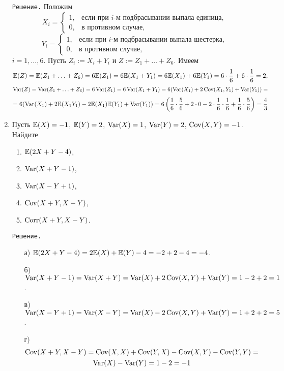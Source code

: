 \begin{enumerate}
\verb"Решение." Положим
\[
X_i =
            \begin{cases}
                            1,     &   \text{если при $i$-м подбрасывании выпала единица,} \\
                            0,     &   \text{в противном случае,}
            \end{cases}
\]
\[
Y_i =
            \begin{cases}
                            1,     &   \text{если при $i$-м подбрасывании выпала шестерка,} \\
                            0,     &   \text{в противном случае,}
            \end{cases}
\]
$i=1, \ldots, 6$. Пусть $Z_i := X_i + Y_i$ и $Z := Z_1 + \ldots + Z_6$. Имеем
\[
\mathbb{E}(Z) = \mathbb{E}(Z_1 + \ldots + Z_6) = 6\mathbb{E}(Z_1) = 6\mathbb{E}(X_1 + Y_1) = 6\mathbb{E}(X_1) + 6\mathbb{E}(Y_1) = 6\cdot\frac{1}{6} + 6\cdot\frac{1}{6} = 2,
\]
\[
\operatorname{Var}(Z) = \operatorname{Var}(Z_1 + \ldots + Z_6) = 6\operatorname{Var}(Z_1) = 6\operatorname{Var}(X_1 + Y_1) = 6(\operatorname{Var}(X_1) + 2\operatorname{Cov}(X_1,Y_1) + \operatorname{Var}(Y_1)) =
\]
\[
 = 6(\operatorname{Var}(X_1) + 2\mathbb{E}(X_1Y_1) - 2\mathbb{E}(X_1)\mathbb{E}(Y_1) + \operatorname{Var}(Y_1)) = 6\left( \frac{1}{6}\cdot\frac{5}{6} + 2\cdot0 - 2\cdot\frac{1}{6}\cdot\frac{1}{6} + \frac{1}{6}\cdot\frac{5}{6} \right) = \frac{4}{3}
\]
\item %
Пусть $\mathbb{E}(X) = -1$, $\mathbb{E}(Y) = 2$, $\operatorname{Var}(X) = 1$, $\operatorname{Var}(Y) = 2$, $\operatorname{Cov}(X,Y) = -1$. Найдите
\begin{enumerate}
  \item $\mathbb{E}(2X+Y-4)$,
  \item $\operatorname{Var}(X+Y-1)$,
  \item $\operatorname{Var}(X-Y+1)$,
  \item $\operatorname{Cov}(X+Y,X-Y)$,
  \item $\operatorname{Corr}(X+Y,X-Y)$.
\end{enumerate}

\verb"Решение."
\begin{enumerate}
\item[а)] $\mathbb{E}(2X+Y-4) = 2\mathbb{E}(X) + \mathbb{E}(Y) - 4 = -2 + 2 - 4 = -4$.

\item[б)] $\operatorname{Var}(X+Y-1) = \operatorname{Var}(X+Y) = \operatorname{Var}(X) + 2\operatorname{Cov}(X,Y) + \operatorname{Var}(Y) = 1 - 2 + 2 = 1$.

\item[в)] $\operatorname{Var}(X-Y+1) = \operatorname{Var}(X-Y) = \operatorname{Var}(X) - 2\operatorname{Cov}(X,Y) + \operatorname{Var}(Y) = 1 + 2 + 2 = 5$.

\item[г)]
\begin{multline*}
\operatorname{Cov}(X+Y, X-Y) = \operatorname{Cov}(X, X) + \operatorname{Cov}(Y, X) - \operatorname{Cov}(X, Y) - \operatorname{Cov}(Y, Y) = \\
 \operatorname{Var}(X) - \operatorname{Var}(Y) = 1 - 2 = -1
\end{multline*}


\end{enumerate}
\end{enumerate}
